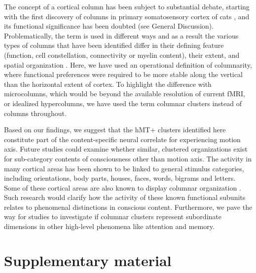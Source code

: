 The concept of a cortical column has been subject to substantial debate, starting with the first discovery of columns in primary somatosensory cortex of cats \parencite{Mountcastle1956}, and its functional significance has been doubted (see General Discussion). Problematically, the term is used in different ways and as a result the various types of columns that have been identified differ in their defining feature (function, cell constellation, connectivity or myelin content), their extent, and spatial organization \parencite{Rakic2008}. Here, we have used an operational definition of columnarity, where functional preferences were required to be more stable along the vertical than the horizontal extent of cortex. To highlight the difference with microcolumns, which would be beyond the available resolution of current fMRI, or idealized hypercolumns, we have used the term columnar clusters instead of columns throughout.

Based on our findings, we suggest that the hMT+ clusters identified here constitute part of the content-specific neural correlate for experiencing motion axis. Future studies could examine whether similar, clustered organizations exist for sub-category contents of consciousness other than motion axis. The activity in many cortical areas has been shown to be linked to general stimulus categories, including orientations, body parts, houses, faces, words, bigrams and letters. Some of these cortical areas are also known to display columnar organization \parencite{Tanaka2003}. Such research would clarify how the activity of these known functional subunits relates to phenomenal distinctions in conscious content. Furthermore, we pave the way for studies to investigate if columnar clusters represent subordinate dimensions in other high-level phenomena like attention and memory.

\clearpage
\section{Supplementary material}

